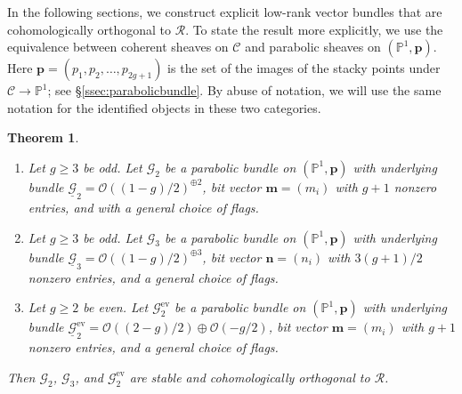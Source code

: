 \documentclass[12pt, letterpaper]{amsart}
\newtheorem{theorem}{Theorem}[section]
\theoremstyle{definition}
\newcommand{\PP}{\mathbb{P} }
\newcommand{\cC}{\mathcal{C} }
\newcommand{\cG}{\mathcal{G} }
\newcommand{\cO}{\mathcal{O} }
\newcommand{\cR}{\mathcal{R} }
\newcommand{\bp}{\mathbf{p} }
\newcommand{\bm}{\mathbf{m} }
\newcommand{\bn}{\mathbf{n} }
\begin{document}
In the following sections, we construct explicit low-rank vector bundles that are cohomologically orthogonal to \(\cR\). To state the result more explicitly, we use the equivalence between coherent sheaves on \(\cC\) and parabolic sheaves on \((\PP^1, \bp)\). Here \(\bp = (p_1, p_2, \dots, p_{2g+1})\) is the set of the images of the stacky points under \(\cC \to \PP^1\); see \S\ref{ssec:parabolicbundle}. By abuse of notation, we will use the same notation for the identified objects in these two categories.

\begin{theorem}\label{thm:initialconst}
\begin{enumerate}
  \item Let \(g \ge 3\) be odd. Let \(\cG_2\) be a parabolic bundle on \((\PP^1, \bp)\) with underlying bundle \(\underline{\cG}_2 = \cO((1-g)/2)^{\oplus 2}\), bit vector \(\bm=(m_i)\) with \(g+1\) nonzero entries, and with a general choice of flags.
  \item Let \(g \ge 3\) be odd. Let \(\cG_3\) be a parabolic bundle on \((\PP^1, \bp)\) with underlying bundle \(\underline{\cG}_3 = \cO((1-g)/2)^{\oplus 3}\), bit vector \(\bn=(n_i)\) with \(3(g+1)/2\) nonzero entries, and a general choice of flags.
  \item Let \(g \ge 2\) be even. Let \(\cG_2^{\mathrm{ev}}\) be a parabolic bundle on \((\PP^1, \bp)\) with underlying bundle \(\underline{\cG}_2^{\mathrm{ev}} = \cO((2-g)/2)\oplus \cO(-g/2)\), bit vector \(\bm=(m_i)\) with \(g+1\) nonzero entries, and a general choice of flags.
\end{enumerate}
Then \(\cG_2\), \(\cG_3\), and \(\cG_2^{\mathrm{ev}}\) are stable and cohomologically orthogonal to \(\cR\).
\end{theorem}
\end{document}
